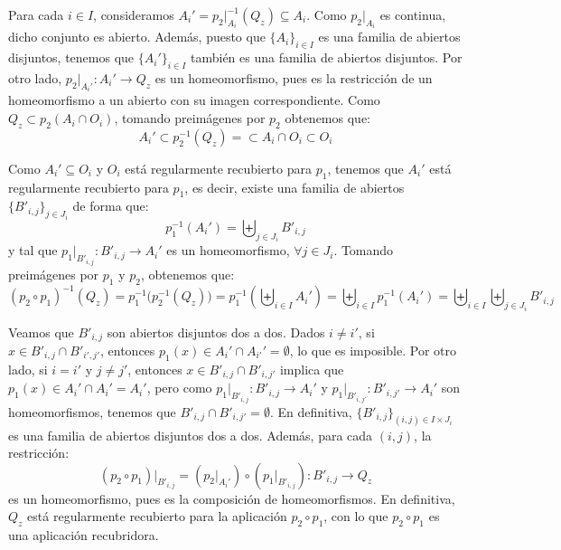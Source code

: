 \begin{ejercicio}
    Para cada $i \in I$, consideramos $A_i' = p_2\big|_{A_i}^{-1}(Q_z)\subseteq A_i$. Como $p_2\big|_{A_i}$ es continua, dicho conjunto es abierto. Además, puesto que $\{A_i\}_{i \in I}$ es una familia de abiertos disjuntos, tenemos que $\{A_i'\}_{i \in I}$ también es una familia de abiertos disjuntos. Por otro lado, $p_2\big|_{A_i'}:A_i'\to Q_z$ es un homeomorfismo, pues es la restricción de un homeomorfismo a un abierto con su imagen correspondiente. Como $Q_z\subset p_2(A_i\cap O_i)$, tomando preimágenes por $p_2$ obtenemos que:
    \begin{equation*}
        A_i'\subset p_2^{-1}(Q_z) = \subset A_i \cap O_i \subset O_i
    \end{equation*}

    Como $A_i'\subseteq O_i$ y $O_i$ está regularmente recubierto para $p_1$, tenemos que $A_i'$ está regularmente recubierto para $p_1$, es decir, existe una familia de abiertos $\{B'_{i,j}\}_{j \in J_i}$ de forma que:
    \begin{equation*}
        p_1^{-1}(A_i') = \biguplus_{j \in J_i}B'_{i,j}
    \end{equation*}
    y tal que $p_1\big|_{B'_{i,j}}:B'_{i,j}\to A_i'$ es un homeomorfismo, $\forall j \in J_i$. Tomando preimágenes por $p_1$ y $p_2$, obtenemos que:
    \begin{equation*}
        (p_2\circ p_1)^{-1}(Q_z) = p_1^{-1}\big(p_2^{-1}(Q_z)\big) = p_1^{-1}\left(\biguplus_{i \in I}A_i'\right) = \biguplus_{i \in I}p_1^{-1}(A_i') = \biguplus_{i \in I}\biguplus_{j \in J_i}B'_{i,j}
    \end{equation*}
    
    Veamos que $B'_{i,j}$ son abiertos disjuntos dos a dos. Dados $i\neq i'$, si $x\in B'_{i,j}\cap B'_{i',j'}$, entonces $p_1(x)\in A_i'\cap A_{i'}' = \emptyset$, lo que es imposible. Por otro lado, si $i = i'$ y $j\neq j'$, entonces $x\in B'_{i,j}\cap B'_{i,j'}$ implica que $p_1(x)\in A_i'\cap A_i' = A_i'$, pero como $p_1\big|_{B'_{i,j}}:B'_{i,j}\to A_i'$ y $p_1\big|_{B'_{i,j'}}:B'_{i,j'}\to A_i'$ son homeomorfismos, tenemos que $B'_{i,j}\cap B'_{i,j'} = \emptyset$. En definitiva, $\{B'_{i,j}\}_{(i,j)\in I\times J_i}$ es una familia de abiertos disjuntos dos a dos. Además, para cada $(i,j)$, la restricción:
    \begin{equation*}
        (p_2\circ p_1)\big|_{B'_{i,j}} = \left(p_2\big|_{A_i'}\right) \circ \left(p_1\big|_{B'_{i,j}}\right) : B'_{i,j} \longrightarrow Q_z
    \end{equation*}
    es un homeomorfismo, pues es la composición de homeomorfismos. En definitiva, $Q_z$ está regularmente recubierto para la aplicación $p_2\circ p_1$, con lo que $p_2\circ p_1$ es una aplicación recubridora.
\end{ejercicio}

